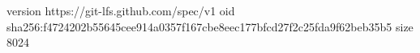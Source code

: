 version https://git-lfs.github.com/spec/v1
oid sha256:f4724202b55645cee914a0357f167cbe8eec177bfcd27f2c25fda9f62beb35b5
size 8024
